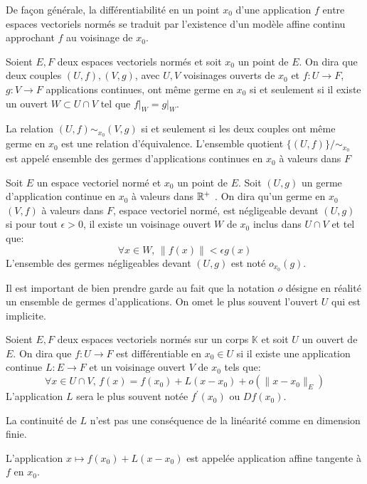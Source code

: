 De façon générale, la différentiabilité en un point $x_0$ d'une application $f$ entre espaces vectoriels normés se traduit par l'existence d'un modèle affine continu approchant $f$ au voisinage de $x_0$.
\begin{defn}
Soient $E,F$ deux espaces vectoriels normés et soit $x_0$ un point de $E$. On dira que deux couples $(U,f),(V,g)$, avec $U,V$ voisinages ouverts de $x_0$ et $f\colon U \to F$,$g \colon V \to F$ applications continues, ont même germe en $x_0$ si et seulement si il existe un ouvert $W \subset U \cap V$ tel que $f\rvert_{W}=g\rvert_{W}$.
\end{defn}
\begin{prop}
La relation $(U,f) \sim_{x_0} (V,g)$ si et seulement si les deux couples ont même germe en $x_0$ est une relation d'équivalence. L'ensemble quotient $\{(U,f)\} / \sim_{x_0}$ est appelé ensemble des germes d'applications continues en $x_0$ à valeurs dans $F$ 
\end{prop}
\begin{defn}
Soit $E$ un espace vectoriel normé et $x_0$ un point de $E$. Soit $(U,g)$ un germe d'application continue en $x_0$ à valeurs dans $\mathbb R^+$ . On dira qu'un germe en $x_0$ $(V,f)$ à valeurs dans $F$, espace vectoriel normé,  est négligeable devant $(U,g)$ si pour tout $\epsilon > 0$, il existe un voisinage ouvert $W$ de $x_0$ inclus dans $U\cap V$ et tel que:
\[
\forall x \in W, \, \|f(x)\| < \epsilon g(x)
\]
L'ensemble des germes négligeables devant $(U,g)$ est noté $o_{x_0}(g)$.
\end{defn}
\begin{rem}
Il est important de bien prendre garde au fait que la notation $o$ désigne en réalité un ensemble de germes d'applications. On omet le plus souvent l'ouvert $U$ qui est implicite. \end{rem}
\begin{fdefn}
Soient $E,F$ deux espaces vectoriels normés sur un corps $\mathbb{K}$
 et soit $U$ un ouvert de $E$. On dira que $f \colon U \to F$ est différentiable en $x_0 \in U$ si il existe une application continue $L \colon E \to F$ et un voisinage ouvert $V$ de $x_0$ tels que:
 \[
 \forall x \in U \cap V, \, f(x) = f(x_0) + L(x-x_0) + o(\|x-x_0\|_E)
 \]
 L'application $L$ sera le plus souvent notée $f^\prime(x_0)$ ou $Df(x_0).$
\end{fdefn}
\begin{rem}
La continuité de $L$ n'est pas une conséquence de la linéarité comme en dimension finie. 
\end{rem}
L'application $ x \mapsto f(x_0) + L(x-x_0)$ est appelée application affine tangente à $f$ en $x_0$.

